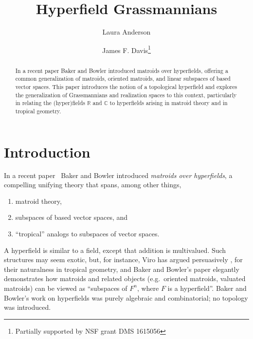\documentclass[10pt, preprint]{article}
\def\C{\mathbb C}
\def\R{\mathbb R}
\theoremstyle{definition}
\begin{document}
\title{Hyperfield Grassmannians}
\author{Laura Anderson
\and
James F. Davis\thanks{Partially supported by NSF grant DMS 1615056}
}
\date{}
\maketitle

\begin{abstract} In a recent paper Baker and Bowler introduced matroids over hyperfields,  offering a common generalization of matroids, oriented matroids, and linear subspaces of based vector spaces.  This  paper introduces the notion of a topological hyperfield and explores the generalization of Grassmannians and realization spaces to this context, 
particularly in relating the (hyper)fields $\R$ and $\C$ to hyperfields arising in matroid theory and in tropical geometry.
\end{abstract}

\section{Introduction}\vspace*{-4pt}

In a recent paper~\cite{Baker-Bowler} Baker and Bowler introduced
\emph{matroids over hyperfields}, a compelling unifying theory that
spans, among other things,\vspace*{-4pt}
%
\begin{enumerate}%
\item
matroid theory,\vspace*{-1pt}
%
\item
subspaces of based vector spaces, and\vspace*{-1pt}
%
\item
``tropical'' analogs to subspaces of vector spaces.
\end{enumerate}
%
A hyperfield is similar to a field, except that addition is multivalued.
Such structures may seem exotic, but, for instance, Viro has argued
persuasively \cite{Viro}, \cite{Viro2} for their naturalness
in tropical geometry, and Baker and Bowler's paper elegantly
demonstrates how matroids and related objects (e.g.~oriented matroids,
valuated matroids) can be viewed as ``subspaces of $F^{n}$, where
$F$ is a hyperfield''. Baker and Bowler's work on hyperfields was purely
algebraic and combinatorial; no topology was introduced.
\end{document}
